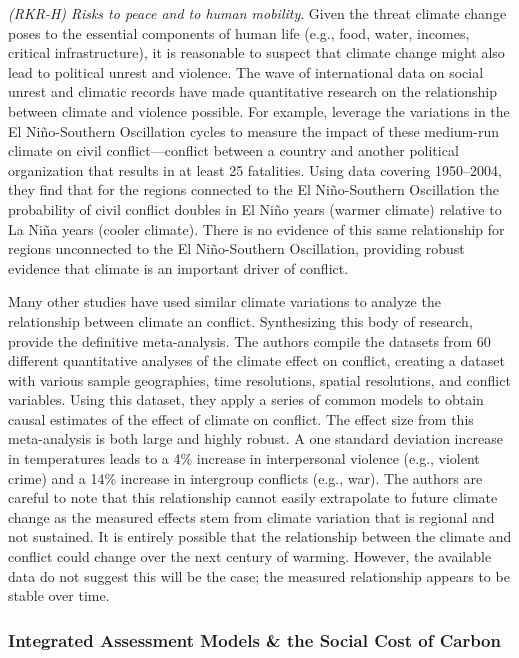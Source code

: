 \textit{(RKR-H) Risks to peace and to human mobility}. Given the threat climate change poses to the essential components of human life (e.g., food, water, incomes, critical infrastructure), it is reasonable to suspect that climate change might also lead to political unrest and violence. The wave of international data on social unrest and climatic records have made quantitative research on the relationship between climate and violence possible. For example, \cite{hsiang2011civil} leverage the variations in the El Ni\~no-Southern Oscillation cycles to measure the impact of these medium-run climate on civil conflict---conflict between a country and another political organization that results in at least 25 fatalities. Using data covering 1950--2004, they find that for the regions connected to the El Ni\~no-Southern Oscillation the probability of civil conflict doubles in El Ni\~no years (warmer climate) relative to La Ni\~na years (cooler climate). There is no evidence of this same relationship for regions unconnected to the El Ni\~no-Southern Oscillation, providing robust evidence that climate is an important driver of conflict. 

Many other studies have used similar climate variations to analyze the relationship between climate an conflict. Synthesizing this body of research, \cite{hsiang2013quantifying} provide the definitive meta-analysis. The authors compile the datasets from 60 different quantitative analyses of the climate effect on conflict, creating a dataset with various sample geographies, time resolutions, spatial resolutions, and conflict variables. Using this dataset, they apply a series of common models to obtain causal estimates of the effect of climate on conflict. The effect size from this meta-analysis is both large and highly robust. A one standard deviation increase in temperatures leads to a 4\% increase in interpersonal violence (e.g., violent crime) and a 14\% increase in intergroup conflicts (e.g., war). The authors are careful to note that this relationship cannot easily extrapolate to future climate change as the measured effects stem from climate variation that is regional and not sustained. It is entirely possible that the relationship between the climate and conflict could change over the next century of warming. However, the available data do not suggest this will be the case; the measured relationship appears to be stable over time.



\subsubsection{Integrated Assessment Models \& the Social Cost of Carbon \label{scc_section}}

